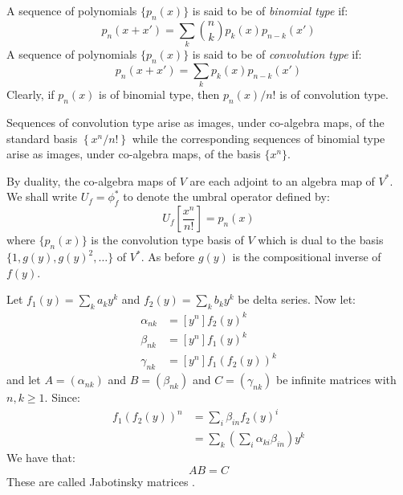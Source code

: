 \documentclass[12pt,dvips]{amsart}
\begin{document}
\noindent
A sequence of polynomials $ \{ p_n(x)\}$ is said to be of {\it binomial type} if:
$$ p_n(x + x') = \sum_k \binom{n}{k} p_k(x) p_{n-k}(x') $$
A sequence of polynomials $\{ p_n(x)\}$ is said to be of {\it convolution type} if:
$$ p_n(x + x') = \sum_k p_k(x) p_{n-k}(x') $$
Clearly, if $p_n(x)$ is of binomial type, then $p_n(x) / n!$ is of convolution type. 

\par\bigskip
Sequences of convolution type arise as images, under co-algebra maps, of the standard basis $\left \{ x^n / n! \right \}$ while the corresponding sequences of binomial type arise as images, under co-algebra maps, of the basis $\{x^n\}$.

By duality, the co-algebra maps of $V$ are each adjoint to an algebra map of $V^*$. 
We shall write $ U_f = \phi_f^* $ to denote the umbral operator defined by:
$$U_f \left [\frac{x^n}{n!} \right ] = p_n(x)$$ 
where $\{ p_n(x)\}$ is the convolution type basis of $V$ which is dual to the basis $ \{1, g(y), g(y)^2, \ldots \} $ of $V^*$. As before $g(y)$ is the compositional inverse of $f(y)$.

\par\bigskip
Let $f_1(y) = \sum_k a_k y^k$ and $f_2(y) = \sum_k b_k y^k$ be delta series. Now let:
\begin{align*}
\alpha_{nk} & =  [y^n] f_2(y)^k \\
\beta_{nk} & =  [y^n] f_1(y)^k \\
\gamma_{nk} & =  [y^n] f_1(f_2(y))^k 
\end{align*}
and let $A = (\alpha_{nk})$ and $B = (\beta_{nk})$ and $C = (\gamma_{nk})$ be infinite matrices with $n,k \geq 1$.
Since:
\begin{align*}
f_1(f_2(y))^n & =  \sum_i \beta_{in} f_2(y)^i \\
& =  \sum_k \left (\sum_i \alpha_{ki} \beta_{in} \right)  y^k
\end{align*}
We have that:
$$AB = C$$
These are called Jabotinsky matrices \cite{COMPSEQ}.
\end{document}
